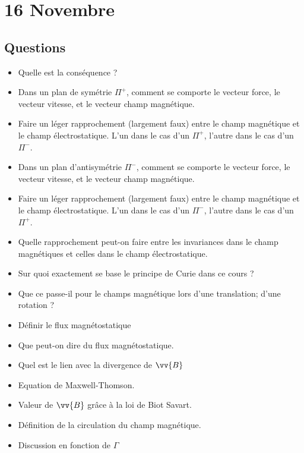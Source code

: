 \documentclass[a4paper, 11pt, hidelinks]{article}
\begin{document}
\section{16 Novembre}


\subsection{Questions}

\begin{itemize}
    \item Quelle est la conséquence ? \cite{Chapitre11}
    \item Dans un plan de symétrie $\Pi^+$, comment se comporte le vecteur force, le vecteur vitesse, et le vecteur champ magnétique. \cite{Chapitre11}
    \item Faire un léger rapprochement (largement faux) entre le champ magnétique et le champ électrostatique. L'un dans le cas d'un $\Pi^+$, l'autre dans le cas d'un $\Pi^-$. \cite{Chapitre11}
    \item Dans un plan d'antisymétrie $\Pi^-$, comment se comporte le vecteur force, le vecteur vitesse, et le vecteur champ magnétique. \cite{Chapitre11}
    \item Faire un léger rapprochement (largement faux) entre le champ magnétique et le champ électrostatique. L'un dans le cas d'un $\Pi^-$, l'autre dans le cas d'un $\Pi^+$. \cite{Chapitre11}
    \item Quelle rapprochement peut-on faire entre les invariances dans le champ magnétiques et celles dans le champ électrostatique. \cite{Chapitre11}
    \item Sur quoi exactement se base le principe de Curie dans ce cours ? \cite{Chapitre11}
    \item Que ce passe-il pour le champs magnétique lors d'une translation; d'une rotation ? \cite{Chapitre11}
    \item Définir le flux magnétostatique \cite{Chapitre11}
    \item Que peut-on dire du flux magnétostatique. \cite{Chapitre11}
    \item Quel est le lien avec la divergence de $\vv{B}$ \cite{Chapitre11}
    \item Equation de Maxwell-Thomson. \cite{Chapitre11}
    \item Valeur de $\vv{B}$ grâce à la loi de Biot Savart. \cite{Chapitre11}
    \item Définition de la circulation du champ magnétique. \cite{Chapitre11}
    \item Discussion en fonction de $\Gamma$ \cite{Chapitre11}

\end{itemize}
\end{document}
